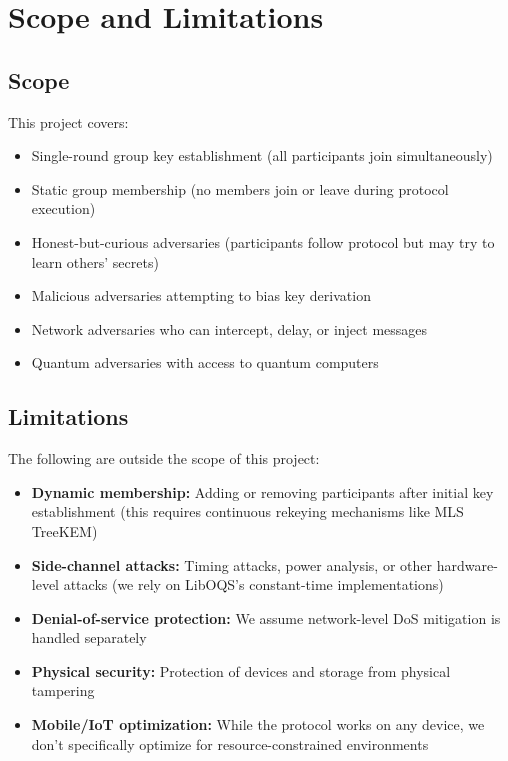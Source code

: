 \documentclass[12pt,a4paper]{report}
\begin{document}
\section{Scope and Limitations}

\subsection{Scope}

This project covers:
\begin{itemize}
\item Single-round group key establishment (all participants join simultaneously)
\item Static group membership (no members join or leave during protocol execution)
\item Honest-but-curious adversaries (participants follow protocol but may try to learn others' secrets)
\item Malicious adversaries attempting to bias key derivation
\item Network adversaries who can intercept, delay, or inject messages
\item Quantum adversaries with access to quantum computers
\end{itemize}

\subsection{Limitations}

The following are outside the scope of this project:
\begin{itemize}
\item \textbf{Dynamic membership:} Adding or removing participants after initial key establishment (this requires continuous rekeying mechanisms like MLS TreeKEM)
\item \textbf{Side-channel attacks:} Timing attacks, power analysis, or other hardware-level attacks (we rely on LibOQS's constant-time implementations)
\item \textbf{Denial-of-service protection:} We assume network-level DoS mitigation is handled separately
\item \textbf{Physical security:} Protection of devices and storage from physical tampering
\item \textbf{Mobile/IoT optimization:} While the protocol works on any device, we don't specifically optimize for resource-constrained environments
\end{itemize}
\end{document}
